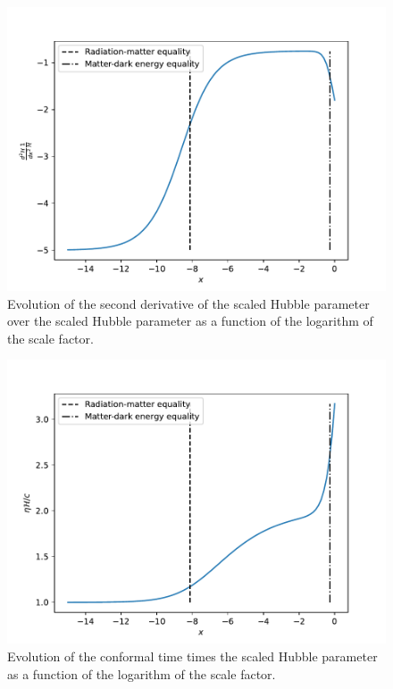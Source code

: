 \documentclass{aa}
\begin{document}
\begin{figure}[ht]
\centering
\includegraphics[width=\hsize]{figures/ddHpddx_over_Hp.pdf}
  \caption{Evolution of the second derivative of the scaled Hubble parameter over the scaled Hubble parameter as a function of the logarithm of the scale factor.}
     \label{fig:ddhpddx}
\end{figure}

\begin{figure}[ht]
\centering
\includegraphics[width=\hsize]{figures/etaHp_over_c.pdf}
  \caption{Evolution of the conformal time times the scaled Hubble parameter as a function of the logarithm of the scale factor.}
     \label{fig:eta}
\end{figure}
\end{document}
